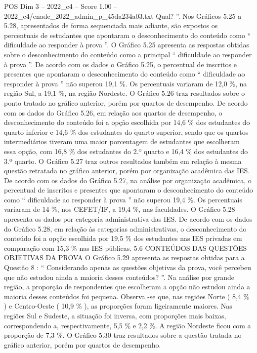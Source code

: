 \begin{textsample}{POS Dim 3 – 2022\_c4 – Score 1.00 – 2022\_c4/enade\_2022\_admin\_p\_45da234a03.txt}
Qual? ”.
Nos Gráficos 5.25 a 5.28, apresentados de forma sequenciada mais adiante, são expostos os percentuais de estudantes que apontaram o desconhecimento do conteúdo como “ dificuldade ao responder à prova ”.
O Gráfico 5.25 apresenta as respostas obtidas sobre o desconhecimento do conteúdo como a principal “ dificuldade ao responder à prova ”.
De acordo com os dados o Gráfico 5.25, o percentual de inscritos e presentes que apontaram o desconhecimento do conteúdo como “ dificuldade ao responder à prova ” não superou 19,1 \%.
Os percentuais variaram de 12,0 \%, na região Sul, a 19,1 \%, na região Nordeste.
O Gráfico 5.26 traz resultados sobre o ponto tratado no gráfico anterior, porém por quartos de desempenho.
De acordo com os dados do Gráfico 5.26, em relação aos quartos de desempenho, o desconhecimento do conteúdo foi a opção escolhida por 14,6 \% dos estudantes do quarto inferior e 14,6 \% dos estudantes do quarto superior, sendo que os quartos intermediários tiveram uma maior porcentagem de estudantes que escolheram essa opção, com 16,8 \% dos estudantes do 2.º quarto e 16,4 \% dos estudantes do 3.º quarto.
O Gráfico 5.27 traz outros resultados também em relação à mesma questão retratada no gráfico anterior, porém por organização acadêmica das IES.
De acordo com os dados do Gráfico 5.27, na análise por organização acadêmica, o percentual de inscritos e presentes que apontaram o desconhecimento do conteúdo como “ dificuldade ao responder à prova ” não superou 19,4 \%.
Os percentuais variaram de 14 \%, nos CEFET/IF, a 19,4 \%, nas faculdades.
O Gráfico 5.28 apresenta os dados por categoria administrativa das IES.
De acordo com os dados do Gráfico 5.28, em relação às categorias administrativas, o desconhecimento do conteúdo foi a opção escolhida por 19,5 \% dos estudantes nas IES privadas em comparação com 15,3 \% nas IES públicas. 5.6 CONTEÚDOS DAS QUESTÕES OBJETIVAS DA PROVA O Gráfico 5.29 apresenta as respostas obtidas para a Questão 8 : “ Considerando apenas as questões objetivas da prova, você percebeu que não estudou ainda a maioria desses conteúdos? ”.
Na análise por grande região, a proporção de respondentes que escolheram a opção não estudou ainda a maioria desses conteúdos foi pequena.
Observa -se que, nas regiões Norte ( 8,4 \% ) e Centro-Oeste ( 10,9 \% ), as proporções foram ligeiramente maiores.
Nas regiões Sul e Sudeste, a situação foi inversa, com proporções mais baixas, correspondendo a, respectivamente, 5,5 \% e 2,2 \%.
A região Nordeste ficou com a proporção de 7,3 \%.
O Gráfico 5.30 traz resultados sobre a questão tratada no gráfico anterior, porém por quartos de desempenho.

\end{textsample}

